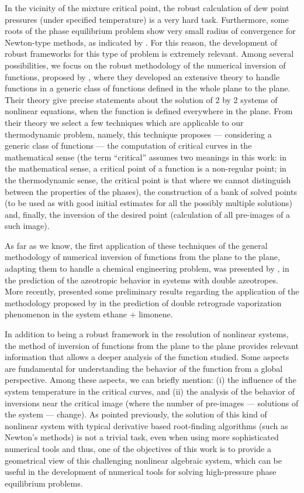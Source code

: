 \documentclass[journal=iecred,manuscript=article]{achemso}
\theoremstyle{definition}
\theoremstyle{remark}
\begin{document}
In the vicinity of the mixture critical point, the robust calculation of dew point pressures (under specified temperature) is a very hard task. Furthermore, some roots of the phase equilibrium problem show very small radius of convergence for Newton-type methods, as indicated by \citet{jnsa}. For this reason, the development of robust frameworks for this type of problem is extremely relevant. Among several possibilities, we focus on the robust methodology of the numerical inversion of functions, proposed by \citet{malta}, 
where they developed an extensive theory to handle functions
in a generic class of functions
defined in the whole plane to the plane. 
Their theory give precise statements about the 
solution of 2 by 2 systems of nonlinear equations, when 
the function is defined everywhere in the plane. 
From their theory we select a few techniques which
are applicable to our thermodynamic problem, namely, this technique \citep{malta} proposes --- considering a 
generic class of functions --- the computation of
 critical curves in the mathematical 
sense (the term \enquote{critical} assumes two meanings in this work: in the mathematical sense, a critical point of a function
 is a non-regular point; in the thermodynamic sense, the 
 critical point is that where we cannot distinguish 
 between the properties of the phases), the construction 
 of a bank of solved points
  (to be used  as 
 with good initial estimates for all 
 the possibly multiple solutions) and, finally, the inversion 
 of the desired point (calculation of all pre-images of a such 
 image).
 
As far as we know, the first application of these techniques of the general methodology of numerical inversion of functions from the plane to the plane, adapting them to handle a chemical engineering problem, was presented by \citet{canadian}, in the prediction of the azeotropic behavior in systems with double azeotropes. More recently, \citet{ireme} presented some preliminary results regarding the application of the methodology proposed by \citet{malta} in the prediction of double retrograde vaporization phenomenon in the system ethane + limonene.

In addition to being a robust framework in the resolution of nonlinear systems, the method of inversion of functions from the plane to the plane provides relevant information that allows a deeper analysis of the function studied. Some aspects are fundamental for understanding the behavior of the function from a global perspective. Among these aspects, we can briefly mention: (i) the influence of the system temperature in the critical curves, and (ii) the analysis of the behavior of inversions near the critical image (where the number of pre-images --- solutions of the system --- change). 
As pointed previously, the solution of this kind of nonlinear system with typical derivative based root-finding algorithms
 (such as Newton's methods) is not a trivial task, even when using more sophisticated numerical tools \cite{jnsa} and thus,
 one of the objectives of this work is to provide a 
 geometrical view of this challenging nonlinear algebraic system, which can be useful in the development of numerical tools for solving high-pressure phase equilibrium problems. 
\end{document}
